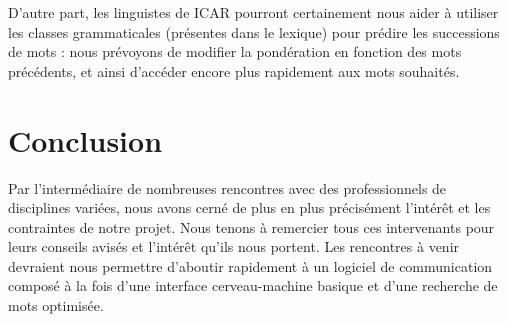 \documentclass[12pt]{article}
\begin{document}
D'autre part, les linguistes de ICAR pourront certainement nous aider à utiliser les classes grammaticales (présentes dans le lexique) pour prédire les successions de mots : nous prévoyons de modifier la pondération en fonction des mots précédents, et ainsi d'accéder encore plus rapidement aux mots souhaités.

\section*{Conclusion}
Par l'intermédiaire de nombreuses rencontres avec des professionnels de disciplines variées, nous avons cerné de plus en plus précisément l'intérêt et les contraintes de notre projet. Nous tenons à remercier tous ces intervenants pour leurs conseils avisés et l'intérêt qu'ils nous portent. Les rencontres à venir devraient nous permettre d'aboutir rapidement à un logiciel de communication composé à la fois d'une interface cerveau-machine basique et d'une recherche de mots optimisée.
\end{document}
